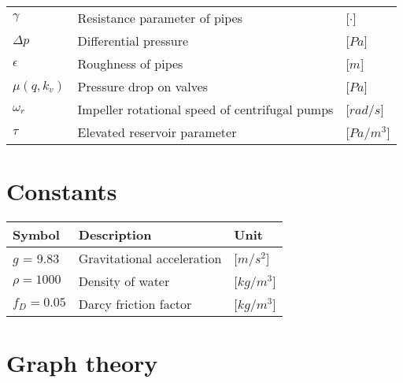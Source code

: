 \begin{tabular}{l l l}
	$\gamma$			&	Resistance parameter of pipes 						& \hspace{25mm}[$\cdot$]\\	
	$\Delta p$			&	Differential pressure 						    	& \hspace{25mm}[$Pa$]\\
	$\epsilon$			&	Roughness of pipes 						    		& \hspace{25mm}[$m$]\\	
	$\mu(q,k_v)$		&	Pressure drop on valves 						   	& \hspace{25mm}[$Pa$]\\
	$\omega_r$			&	Impeller rotational speed of centrifugal pumps 		& \hspace{25mm}[$rad/s$]\\
	$\tau$				&	Elevated reservoir parameter 			 			& \hspace{25mm}[$Pa/m^3$]\\	
\end{tabular}

\section*{Constants}

\begin{tabular}{l l l} 
	\textbf{Symbol}		&	\textbf{Description}							& \hspace{64mm}\textbf{Unit}			\\\hline						
	$g$ = 9.83 			&	Gravitational acceleration						& \hspace{64mm}[$m/s^2$]\\
	$\rho = 1000$		&	Density of water								& \hspace{64mm}[$kg/m^3$]\\
	$f_D = 0.05$		&	Darcy friction factor							& \hspace{64mm}[$kg/m^3$]\\
\end{tabular}

\newpage

\section*{Graph theory}


